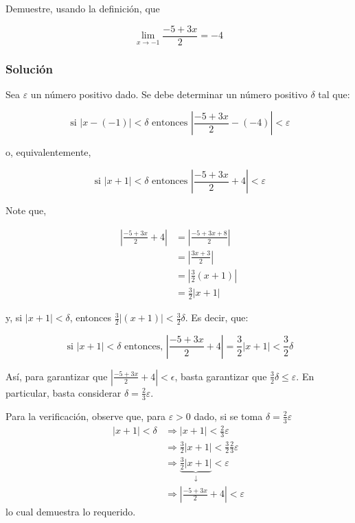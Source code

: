 Demuestre, usando la definición, que

$$\lim_{x \rightarrow-1} \frac{-5+3 x}{2}=-4
$$

\begin{soluciones}
  \subsubsection*{Solución}

  Sea $\varepsilon$ un número positivo dado. Se debe determinar un número positivo $\delta$ tal que:

  $$
  \text { si }|x-(-1)|<\delta \text { entonces }\left|\frac{-5+3 x}{2}-(-4)\right|<\varepsilon
  $$

  o, equivalentemente,

  $$
  \text { si }|x+1|<\delta \text { entonces }\left|\frac{-5+3 x}{2}+4\right|<\varepsilon
  $$

  Note que,

  $$
  \begin{aligned}
  \left|\frac{-5+3 x}{2}+4\right| & =\left|\frac{-5+3 x+8}{2}\right| \\
  & =\left|\frac{3 x+3}{2}\right| \\
  & =\left|\frac{3}{2}(x+1)\right| \\
  & =\frac{3}{2}|x+1|
  \end{aligned}
  $$

  y, si $|x+1|<\delta$, entonces $\frac{3}{2}|(x+1)|<\frac{3}{2} \delta$. Es decir, que:

  $$
  \text { si }|x+1|<\delta \text { entonces, }\left|\frac{-5+3 x}{2}+4\right|=\frac{3}{2}|x+1|<\frac{3}{2} \delta
  $$

  Así, para garantizar que $\left|\frac{-5+3 x}{2}+4\right|<\epsilon$, basta garantizar que $\frac{3}{2} \delta \leq \varepsilon$. En particular, basta considerar $\delta=\frac{2}{3} \varepsilon$. \medbreak

  Para la verificación, observe que, para $\varepsilon>0$ dado, si se toma $\delta=\frac{2}{3} \varepsilon$
  $$
  \begin{aligned}
  |x+1|<\delta & \Longrightarrow|x+1|<\frac{2}{3} \varepsilon \\
  & \Longrightarrow \frac{3}{2}|x+1|<\frac{3}{2} \frac{2}{3} \varepsilon \\
  & \Longrightarrow \underbrace{\frac{3}{2}|x+1|}_{\downarrow}<\varepsilon \\
  & \Longrightarrow\left|\frac{-5+3 x}{2}+4\right|<\varepsilon
  \end{aligned}
  $$
  lo cual demuestra lo requerido.
\end{soluciones}